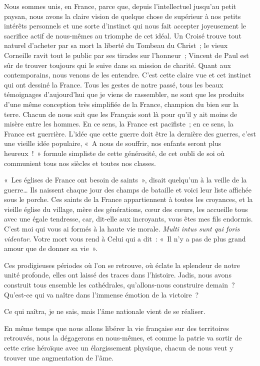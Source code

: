 \documentclass[french,twoside]{book} %
\begin{document}
Nous sommes unis, en France, parce que, depuis l’intellectuel jusqu’au petit paysan, nous avons la claire vision de quelque chose de supérieur à nos petits intérêts personnels et une sorte d’instinct qui nous fait accepter joyeusement le sacrifice actif de nous-mêmes au triomphe de cet idéal. Un Croisé trouve tout naturel d’acheter par sa mort la liberté du Tombeau du Christ ; le vieux Corneille ravit tout le public par ses tirades sur l’honneur ; Vincent de Paul est sûr de trouver toujours qui le suive dans sa mission de charité. Quant aux contemporains, nous venons de les entendre. C’est cette claire vue et cet instinct qui ont dessiné la France. Tous les gestes de notre passé, tous les beaux témoignages d’aujourd’hui que je viens de rassembler, ne sont que les produits d’une même conception très simplifiée de la France, champion du bien sur la terre. Chacun de nous sait que les Français sont là pour qu’il y ait moins de misère entre les hommes. En ce sens, la France est pacifiste ; en ce sens, la France est guerrière. L’idée que cette guerre doit être la dernière des guerres, c’est une vieille idée populaire, « A nous de souffrir, nos enfants seront plus heureux ! » formule simpliste de cette générosité, de cet oubli de soi où communient tous nos siècles et toutes nos classes.‌\par
« Les églises de France ont besoin de saints », disait quelqu’un à la veille de la guerre… Ils naissent chaque jour des champs de bataille et voici leur liste affichée sous le porche. Ces saints de la France appartiennent à toutes les croyances, et la vieille église du village, mère des générations, cœur des cœurs, les accueille tous avec une égale tendresse, car, dit-elle aux incroyants, vous êtes mes fils endormis. C’est moi qui vous ai formés à la haute vie morale. {\itshape Multi intus sunt qui foris videntur}. Votre mort vous rend à Celui qui a dit : « Il n’y a pas de plus grand amour que de donner sa vie ».‌\par
Ces prodigieuses périodes où l’on se retrouve, où éclate la splendeur de notre unité profonde, elles ont laissé des traces dans l’histoire. Jadis, nous avons construit tous ensemble les cathédrales, qu’allons-nous construire demain ? Qu’est-ce qui va naître dans l’immense émotion de la victoire ?‌\par
Ce qui naîtra, je ne sais, mais l’âme nationale vient de se réaliser.‌\par
En même temps que nous allons libérer la vie française sur des territoires retrouvés, nous la dégagerons en nous-mêmes, et comme la patrie va sortir de cette crise héroïque avec un élargissement physique, chacun de nous veut y trouver une augmentation de l’âme.‌\par
\end{document}
